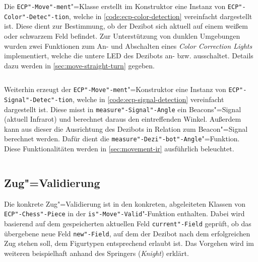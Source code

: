 
Die \texttt{ECP"-Move"-ment}"=Klasse erstellt im Konstruktor eine Instanz von \texttt{ECP"-Color"-Detec"-tion}, welche in \autoref{code:ecp-color-detection} vereinfacht dargestellt ist. Diese dient zur Bestimmung, ob der Dezibot sich aktuell auf einem weißem oder schwarzem Feld befindet. Zur Unterstützung von dunklen Umgebungen wurden zwei Funktionen zum An- und Abschalten eines \emph{Color Correction Lights} implementiert, welche die untere LED des Dezibots an- bzw. ausschaltet. Details dazu werden in \autoref{sec:move-straight-turn} gegeben.

\begin{listing}[h]
    \inputminted{cpp}{../assets/code/ECPColorDetection.cpp}
    \caption{Vereinfachter Code"=Ausschnitt zur \texttt{ECP"-Color"-Detec"-tion}"=Klasse}
    \label{code:ecp-color-detection}
\end{listing}


Weiterhin erzeugt der \texttt{ECP"-Move"-ment}"=Konstruktor eine Instanz von \texttt{ECP"-Signal"-Detec"-tion}, welche in \autoref{code:ecp-signal-detection} vereinfacht dargestellt ist. Diese misst in \texttt{measure"-Signal"-Angle} ein Beacons"=Signal (aktuell Infrarot) und berechnet daraus den eintreffenden Winkel. Außerdem kann aus dieser die Ausrichtung des Dezibots in Relation zum Beacon"=Signal berechnet werden. Dafür dient die \texttt{measure"-Dezi"-bot"-Angle}"=Funktion. Diese Funktionalitäten werden in \autoref{sec:movement-ir} ausführlich beleuchtet.

\begin{listing}[h]
    \inputminted{cpp}{../assets/code/ECPSignalDetection.cpp}
    \caption{Vereinfachter Code"=Ausschnitt zur \texttt{ECP"-Signal"-Detec"-tion}"=Klasse}
    \label{code:ecp-signal-detection}
\end{listing}


\subsection{Zug"=Validierung}
\label{sec:move-validation}


Die konkrete Zug"=Validierung ist in den konkreten, abgeleiteten Klassen von \texttt{ECP"-Chess"-Piece} in der \texttt{is"-Move"-Valid}"-Funktion enthalten. Dabei wird basierend auf dem gespeicherten aktuellen Feld \texttt{current"-Field} geprüft, ob das übergebene neue Feld \texttt{new"-Field}, auf dem der Dezibot nach dem erfolgreichen Zug stehen soll, dem Figurtypen entsprechend erlaubt ist. Das Vorgehen wird im weiteren beispielhaft anhand des Springers (\emph{Knight}) erklärt.

